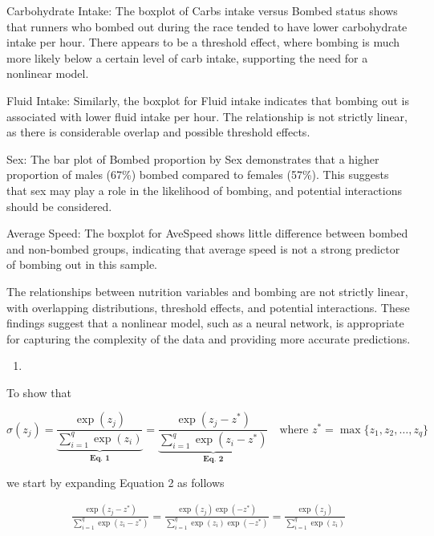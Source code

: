 \documentclass[
]{article}
\providecommand{\tightlist}{%
  \setlength{\itemsep}{0pt}\setlength{\parskip}{0pt}}
\begin{document}
Carbohydrate Intake: The boxplot of Carbs intake versus Bombed status
shows that runners who bombed out during the race tended to have lower
carbohydrate intake per hour. There appears to be a threshold effect,
where bombing is much more likely below a certain level of carb intake,
supporting the need for a nonlinear model.

Fluid Intake: Similarly, the boxplot for Fluid intake indicates that
bombing out is associated with lower fluid intake per hour. The
relationship is not strictly linear, as there is considerable overlap
and possible threshold effects.

Sex: The bar plot of Bombed proportion by Sex demonstrates that a higher
proportion of males (67\%) bombed compared to females (57\%). This
suggests that sex may play a role in the likelihood of bombing, and
potential interactions should be considered.

Average Speed: The boxplot for AveSpeed shows little difference between
bombed and non-bombed groups, indicating that average speed is not a
strong predictor of bombing out in this sample.

The relationships between nutrition variables and bombing are not
strictly linear, with overlapping distributions, threshold effects, and
potential interactions. These findings suggest that a nonlinear model,
such as a neural network, is appropriate for capturing the complexity of
the data and providing more accurate predictions. \newpage

\begin{enumerate}
\def\labelenumi{\alph{enumi}.}
\setcounter{enumi}{1}
\tightlist
\item
\end{enumerate}

To show that

\[
\sigma(z_j) = \underbrace{\frac{\exp(z_j)}{\sum_{i=1}^q \exp(z_i)}}_\textbf{Eq. 1} =\underbrace{\frac{\exp(z_j - z^*)}{\sum_{i=1}^q \exp(z_i - z^*)}}_{\textbf{Eq. 2}} \quad \text{where } z^* = \max \{z_1,z_2,\dots,z_q\}
\] \vspace{0.2cm}

we start by expanding Equation 2 as follows

\[
\begin{aligned}
\frac{\exp(z_j - z^*)}{\sum_{i=1}^q \exp(z_i - z^*)} = \frac{\exp(z_j)\exp(-z^*)}{\sum_{i=1}^q \exp(z_i) \exp(- z^*)} = \frac{\exp(z_j)}{\sum_{i=1}^q \exp(z_i)}
\end{aligned}
\]

\vspace{0.2cm}
\end{document}
